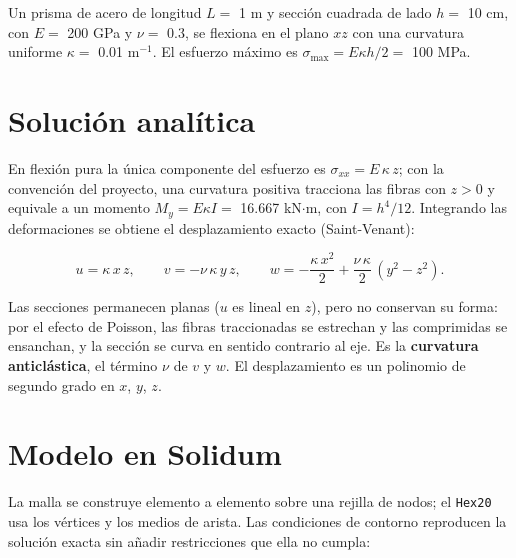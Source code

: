 \documentclass[11pt,oneside]{report}
\begin{document}
Un prisma de acero de longitud $L =$ 1 m y sección cuadrada de lado $h =$ 10 cm, con $E =$ 200 GPa y $\nu =$ 0.3, se flexiona en el plano $xz$ con una curvatura uniforme $\kappa =$ 0.01 $\mathrm{m}^{-1}$. El esfuerzo máximo es $\sigma_{\max} = E\kappa h/2 =$ 100 MPa.

\section{Solución analítica}

En flexión pura la única componente del esfuerzo es $\sigma_{xx} = E\,\kappa\,z$; con la convención del proyecto, una curvatura positiva tracciona las fibras con $z > 0$ y equivale a un momento $M_y = E\kappa I =$ 16.667 kN\ensuremath{\cdot}m, con $I = h^4/12$. Integrando las deformaciones se obtiene el desplazamiento exacto (Saint-Venant):

\[
u = \kappa\,x\,z,
\qquad
v = -\nu\,\kappa\,y\,z,
\qquad
w = -\frac{\kappa\,x^2}{2} + \frac{\nu\,\kappa}{2}\,(y^2 - z^2).
\]

Las secciones permanecen planas ($u$ es lineal en $z$), pero no conservan su forma: por el efecto de Poisson, las fibras traccionadas se estrechan y las comprimidas se ensanchan, y la sección se curva en sentido contrario al eje. Es la \textbf{curvatura anticlástica}, el término $\nu$ de $v$ y $w$. El desplazamiento es un polinomio de segundo grado en $x$, $y$, $z$.

\section{Modelo en Solidum}

La malla se construye elemento a elemento sobre una rejilla de nodos; el \texttt{Hex20} usa los vértices y los medios de arista. Las condiciones de contorno reproducen la solución exacta sin añadir restricciones que ella no cumpla:
\end{document}
